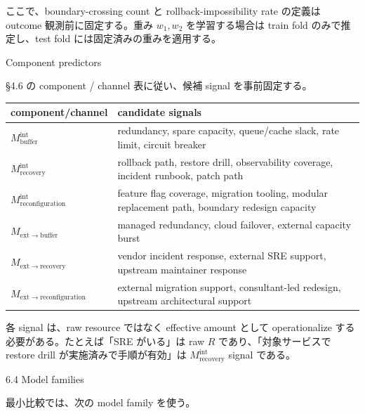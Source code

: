 \documentclass[12pt,a4paper]{article}
\begin{document}
ここで、boundary-crossing count と rollback-impossibility rate の定義は outcome 観測前に固定する。重み \(w_1,w_2\) を学習する場合は train fold のみで推定し、test fold には固定済みの重みを適用する。

Component predictors

§4.6 の component / channel 表に従い、候補 signal を事前固定する。

{\def\LTcaptype{table} %
\begin{longtable}[]{@{}
  >{\raggedright\arraybackslash}p{}
  >{\raggedright\arraybackslash}p{}@{}}
\toprule\noalign{}
\begin{minipage}[b]{\linewidth}\raggedright
component/channel
\end{minipage} & \begin{minipage}[b]{\linewidth}\raggedright
candidate signals
\end{minipage} \\
\midrule\noalign{}
\endhead
\bottomrule\noalign{}
\endlastfoot
\(M_{\mathrm{buffer}}^{\mathrm{int}}\) & redundancy, spare capacity, queue/cache slack, rate limit, circuit breaker \\
\(M_{\mathrm{recovery}}^{\mathrm{int}}\) & rollback path, restore drill, observability coverage, incident runbook, patch path \\
\(M_{\mathrm{reconfiguration}}^{\mathrm{int}}\) & feature flag coverage, migration tooling, modular replacement path, boundary redesign capacity \\
\(M_{\mathrm{ext}\to\mathrm{buffer}}\) & managed redundancy, cloud failover, external capacity burst \\
\(M_{\mathrm{ext}\to\mathrm{recovery}}\) & vendor incident response, external SRE support, upstream maintainer response \\
\(M_{\mathrm{ext}\to\mathrm{reconfiguration}}\) & external migration support, consultant-led redesign, upstream architectural support \\
\end{longtable}
}

各 signal は、raw resource ではなく effective amount として operationalize する必要がある。たとえば「SRE がいる」は raw \(R\) であり、「対象サービスで restore drill が実施済みで手順が有効」は \(M_{\mathrm{recovery}}^{\mathrm{int}}\) signal である。

6.4 Model families

最小比較では、次の model family を使う。
\end{document}
